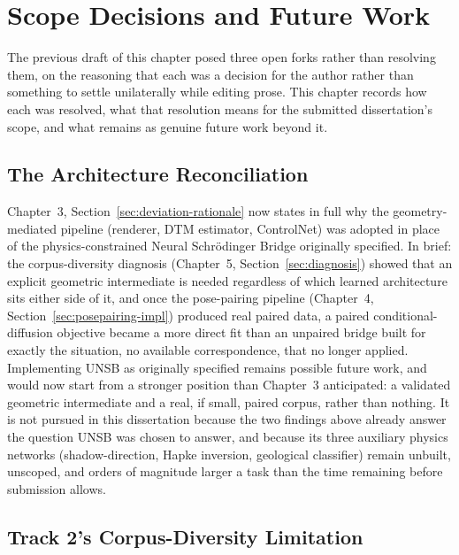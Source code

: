 \chapter{Scope Decisions and Future Work}
\label{ch:futureplan}

The previous draft of this chapter posed three open forks rather than resolving them, on the reasoning that each was a decision for the author rather than something to settle unilaterally while editing prose. This chapter records how each was resolved, what that resolution means for the submitted dissertation's scope, and what remains as genuine future work beyond it.

\section{The Architecture Reconciliation}
\label{sec:reconcile}

Chapter~3, Section~\ref{sec:deviation-rationale} now states in full why the geometry-mediated pipeline (renderer, DTM estimator, ControlNet) was adopted in place of the physics-constrained Neural Schr\"{o}dinger Bridge originally specified. In brief: the corpus-diversity diagnosis (Chapter~5, Section~\ref{sec:diagnosis}) showed that an explicit geometric intermediate is needed regardless of which learned architecture sits either side of it, and once the pose-pairing pipeline (Chapter~4, Section~\ref{sec:posepairing-impl}) produced real paired data, a paired conditional-diffusion objective became a more direct fit than an unpaired bridge built for exactly the situation, no available correspondence, that no longer applied. Implementing UNSB as originally specified remains possible future work, and would now start from a stronger position than Chapter~3 anticipated: a validated geometric intermediate and a real, if small, paired corpus, rather than nothing. It is not pursued in this dissertation because the two findings above already answer the question UNSB was chosen to answer, and because its three auxiliary physics networks (shadow-direction, Hapke inversion, geological classifier) remain unbuilt, unscoped, and orders of magnitude larger a task than the time remaining before submission allows.

\section{Track 2's Corpus-Diversity Limitation}
\label{sec:track2-decision}

